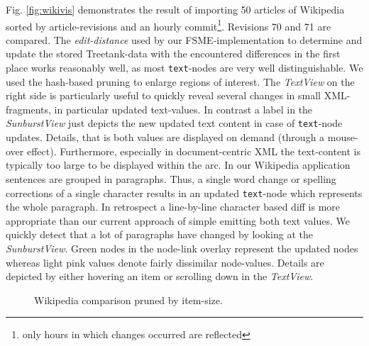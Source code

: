 Fig. \ref{fig:wikivis} demonstrates the result of importing 50 articles of Wikipedia sorted by article-revisions and an hourly commit\footnote{only hours in which changes occurred are reflected}. Revisions 70 and 71 are compared. The \emph{edit-distance} used by our FSME-implementation to determine and update the stored Treetank-data with the encountered differences in the first place works reasonably well, as most \texttt{text}-nodes are very well distinguishable. We used the hash-based pruning to enlarge regions of interest. The \emph{TextView} on the right side is particularly useful to quickly reveal several changes in small XML-fragments, in particular updated text-values. In contrast a label in the \emph{SunburstView} just depicts the new updated text content in case of \texttt{text}-node updates. Details, that is both values are displayed on demand (through a mouse-over effect). Furthermore, especially in document-centric XML the text-content is typically too large to be displayed within the arc. In our Wikipedia application sentences are grouped in paragraphs. Thus, a single word change or spelling corrections of a single character results in an updated \texttt{text}-node which represents the whole paragraph. In retrospect a line-by-line character based diff is more appropriate than our current approach of simple emitting both text values. We quickly detect that a lot of paragraphs have changed by looking at the \emph{SunburstView}. Green nodes in the node-link overlay represent the updated nodes whereas light pink values denote fairly dissimilar node-values. Details are depicted by either hovering an item or scrolling down in the \emph{TextView}. %

\begin{figure}[tb]
\caption{\label{fig:wikivis-rev90106} Wikipedia comparison pruned by item-size.}
\end{figure}

